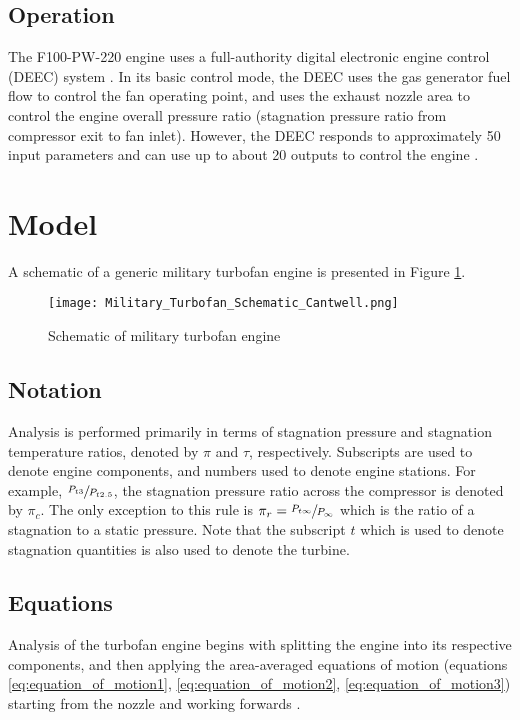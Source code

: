\documentclass{article}
\begin{document}
\subsection{Operation}

The F100-PW-220 engine uses a full-authority digital electronic engine control (DEEC) system \cite{Childre1989}. In its basic control mode, the DEEC uses the gas generator fuel flow to control the fan operating point, and uses the exhaust nozzle area to control the engine overall pressure ratio (stagnation pressure ratio from compressor exit to fan inlet). However, the DEEC responds to approximately 50 input parameters and can use up to about 20 outputs to control the engine \cite{Childre1989}.


\section{Model}

A schematic of a generic military turbofan engine is presented in Figure \ref{fig:turbofan_schematic}. 

\begin{figure}
\caption{Schematic of military turbofan engine \cite{cantwell283}}
\label{fig:turbofan_schematic}
\begin{center}
\texttt{[image: Military\_Turbofan\_Schematic\_Cantwell.png]}
\end{center}
\end{figure}

\subsection{Notation}
Analysis is performed primarily in terms of stagnation pressure and stagnation temperature ratios, denoted by $\pi$ and $\tau$, respectively. Subscripts are used to denote engine components, and numbers used to denote engine stations. For example, $\sfrac{P_{t3}}{P_{t2.5}}$, the stagnation pressure ratio across the compressor is denoted by $\pi_c$. The only exception to this rule is $\pi_r = \sfrac	{P_{t\infty}}{P_{\infty}}$ which is the ratio of a stagnation to a static pressure. Note that the subscript $t$ which is used to denote stagnation quantities is also used to denote the turbine.

\subsection{Equations}

Analysis of the turbofan engine begins with splitting the engine into its respective components, and then applying the area-averaged equations of motion (equations \ref{eq:equation_of_motion1}, \ref{eq:equation_of_motion2}, \ref{eq:equation_of_motion3}) starting from the nozzle and working forwards \cite{cantwell283}. 
\end{document}
